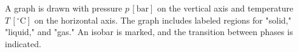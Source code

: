 A graph is drawn with pressure \( p \, [\text{bar}] \) on the vertical axis and temperature \( T \, [^\circ \text{C}] \) on the horizontal axis. The graph includes labeled regions for "solid," "liquid," and "gas." An isobar is marked, and the transition between phases is indicated.